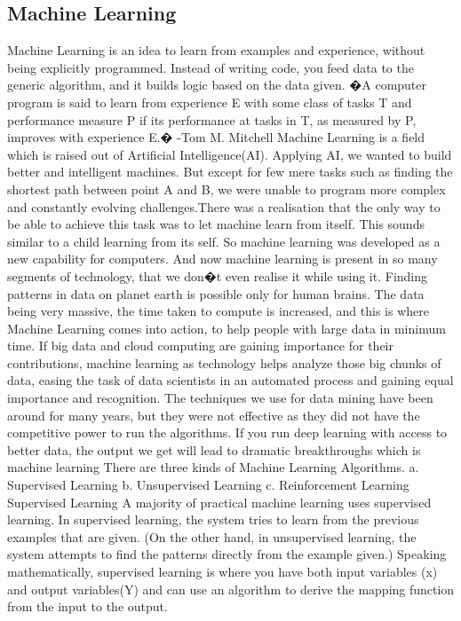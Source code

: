   \subsection{Machine Learning}
Machine Learning is an idea to learn from examples and experience, without being explicitly programmed. Instead of writing code, you feed data to the generic algorithm, and it builds logic based on the data given.
�A computer program is said to learn from experience E with some class of tasks T and performance measure P if its performance at tasks in T, as measured by P, improves with experience E.� -Tom M. Mitchell
Machine Learning is a field which is raised out of Artificial Intelligence(AI). Applying AI, we wanted to build better and intelligent machines. But except for few mere tasks such as finding the shortest path between point A and B, we were unable to program more complex and constantly evolving challenges.There was a realisation that the only way to be able to achieve this task was to let machine learn from itself. This sounds similar to a child learning from its self. So machine learning was developed as a new capability for computers. And now machine learning is present in so many segments of technology, that we don�t even realise it while using it.
Finding patterns in data on planet earth is possible only for human brains. The data being very massive, the time taken to compute is increased, and this is where Machine Learning comes into action, to help people with large data in minimum time.
If big data and cloud computing are gaining importance for their contributions, machine learning as technology helps analyze those big chunks of data, easing the task of data scientists in an automated process and gaining equal importance and recognition.
The techniques we use for data mining have been around for many years, but they were not effective as they did not have the competitive power to run the algorithms. 
If you run deep learning with access to better data, the output we get will lead to dramatic breakthroughs which is machine learning
There are three kinds of Machine Learning Algorithms.
a. Supervised Learning
b. Unsupervised Learning
c. Reinforcement Learning
Supervised Learning
A majority of practical machine learning uses supervised learning.
In supervised learning, the system tries to learn from the previous examples that are given. (On the other hand, in unsupervised learning, the system attempts to find the patterns directly from the example given.)
Speaking mathematically, supervised learning is where you have both input variables (x) and output variables(Y) and can use an algorithm to derive the mapping function from the input to the output.
